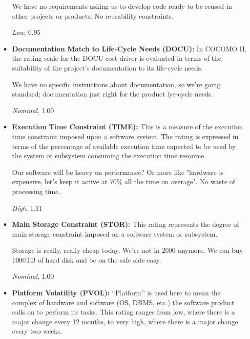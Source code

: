 \documentclass[english]{article}
\begin{document}
\begin{itemize}
We have no requirements asking us to develop code ready to be reused in other projects or products. No reusability constraints.

\textit{Low}, 0.95


\item \textbf{Documentation Match to Life-Cycle Needs (DOCU):} In COCOMO II, the rating scale for the DOCU cost driver is evaluated in terms of the suitability of the project’s documentation to its life-cycle needs.

We have no specific instructions about documentation, so we're going standard; documentation just right for the product lye-cycle needs.

\textit{Nominal}, 1.00


\item \textbf{Execution Time Constraint (TIME):} This is a measure of the execution time constraint imposed upon a software system. The rating is expressed in terms of the percentage of available execution time expected to be used by the system or subsystem consuming the execution time resource.

Our software will be heavy on performance? Or more like "hardware is expensive, let's keep it active at 70\% all the time on average". No waste of processing time.

\textit{High}, 1.11


\item \textbf{Main Storage Constraint (STOR):} This rating represents the degree of main storage constraint imposed on a software system or subsystem.

Storage is really, really cheap today. We're not in 2000 anymore.
We can buy 1000TB of hard disk and be on the safe side easy.

\textit{Nominal}, 1.00


\item \textbf{Platform Volatility (PVOL):} “Platform” is used here to mean the complex of hardware and software (OS, DBMS, etc.)
the software product calls on to perform its tasks. This rating ranges from low, where there is a major change every 12 months, to very high, where there is a major change every two weeks.


\end{itemize}
\end{document}
